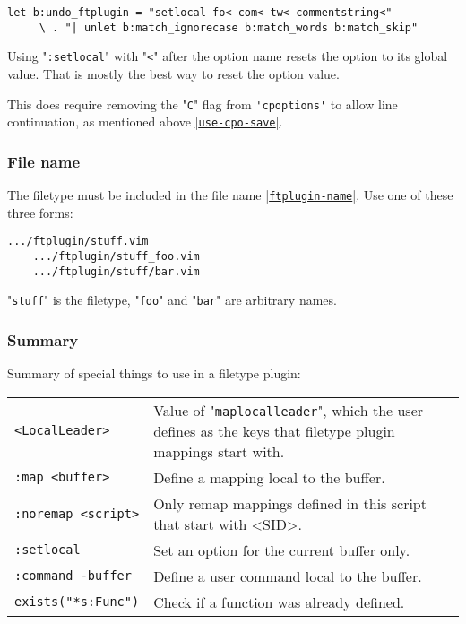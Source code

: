 \begin{Verbatim}[samepage=true]
 let b:undo_ftplugin = "setlocal fo< com< tw< commentstring<"
     \ . "| unlet b:match_ignorecase b:match_words b:match_skip"
\end{Verbatim}

Using "\verb!:setlocal!" with "\verb!<!" after the option name resets the option to its global value.
That is mostly the best way to reset the option value.

This does require removing the "\verb!C!" flag from \verb!'cpoptions'! to allow line continuation, as mentioned above \hyperref[use-cpo-save]{|\texttt{use-cpo-save}|}.

\subsubsection{File name}
The filetype must be included in the file name \hyperref[ftplugin-name]{|\texttt{ftplugin-name}|}.
Use one of these three forms:

\begin{Verbatim}[samepage=true]
    .../ftplugin/stuff.vim
    .../ftplugin/stuff_foo.vim
    .../ftplugin/stuff/bar.vim
\end{Verbatim}

"\verb!stuff!" is the filetype, "\verb!foo!" and "\verb!bar!" are arbitrary names.

\subsubsection{Summary}
\label{ftplugin-special}
Summary of special things to use in a filetype plugin:

\begin{center} \begin{tabular}{l l} %
				\verb!<LocalLeader>! & Value of "\texttt{maplocalleader}", which the user defines as the keys that filetype plugin mappings start with. \\
				\verb!:map <buffer>! & Define a mapping local to the buffer. \\
				\verb!:noremap <script>! & Only remap mappings defined in this script that start with <SID>. \\
				\verb!:setlocal! & Set an option for the current buffer only. \\
				\verb!:command -buffer! & Define a user command local to the buffer. \\
				\verb!exists("*s:Func")! & Check if a function was already defined. \\
\end{tabular} \end{center}

